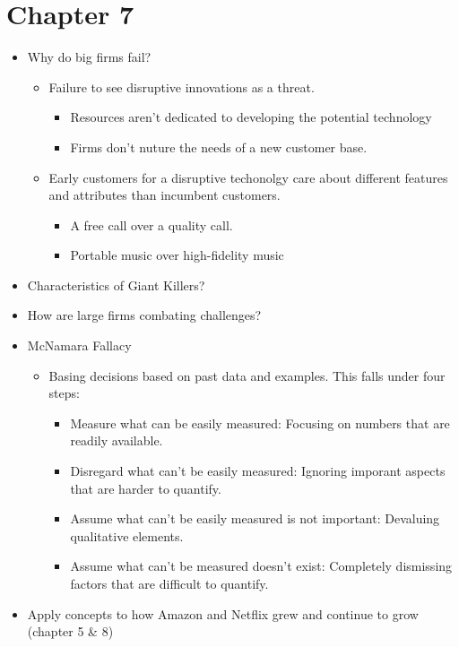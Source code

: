 \documentclass{report}
\begin{document}
\chapter*{Chapter 7}
\begin{itemize}
    \item Why do big firms fail?
        \begin{itemize}
            \item Failure to see disruptive innovations as a threat.
            \begin{itemize}[label=$\circ$]
                \item Resources aren't dedicated to developing the potential technology
                \item Firms don't nuture the needs of a new customer base.
            \end{itemize}
        \item Early customers for a disruptive techonolgy care about different features and attributes than incumbent customers.
            \begin{itemize}[label=$\circ$]
                \item A free call over a quality call.
                \item Portable music over high-fidelity music
            \end{itemize}
        \end{itemize}
    \item Characteristics of Giant Killers?
    \item How are large firms combating challenges?
    \item McNamara Fallacy
        \begin{itemize}[label=$\circ$]
            \item Basing decisions based on past data and examples. This falls under four steps:
                \begin{itemize}[label=$\circ$]
                    \item Measure what can be easily measured: Focusing on numbers that are readily available.
                    \item Disregard what can't be easily measured: Ignoring imporant aspects that are harder to quantify.
                    \item Assume what can't be easily measured is not important: Devaluing qualitative elements.
                    \item Assume what can't be measured doesn't exist: Completely dismissing factors that are difficult to quantify.
                \end{itemize}

        \end{itemize}
    \item Apply concepts to how Amazon and Netflix grew and continue to grow (chapter 5 & 8)
\end{itemize}
\end{document}
